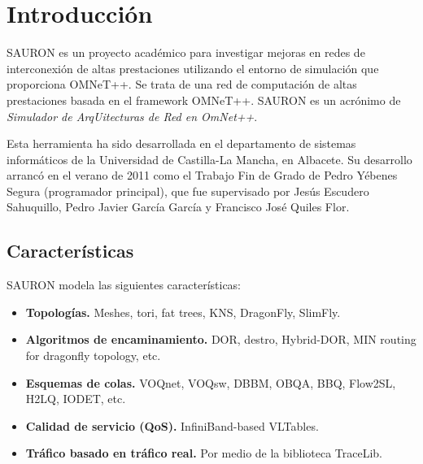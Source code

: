 \chapter{Introducción}\label{sec:cap1}
SAURON es un proyecto académico para investigar mejoras en redes de interconexión de altas prestaciones utilizando el entorno de simulación que proporciona OMNeT++. Se trata de una red de computación de altas prestaciones basada en el framework OMNeT++. SAURON es un acrónimo de \emph{Simulador de ArqUitecturas de Red en OmNet++}.

Esta herramienta ha sido desarrollada en el departamento de sistemas informáticos de la Universidad de Castilla-La Mancha, en Albacete. Su desarrollo arrancó en el verano de 2011 como el Trabajo Fin de Grado de Pedro Yébenes Segura (programador principal), que fue supervisado por Jesús Escudero Sahuquillo, Pedro Javier García García y Francisco José Quiles Flor.

\section{Características}
SAURON modela las siguientes características:

\begin{itemize}
    \item \textbf{Topologías.} Meshes, tori, fat trees, KNS, DragonFly, SlimFly.
    \item \textbf{Algoritmos de encaminamiento.} DOR, destro, Hybrid-DOR, MIN routing for dragonfly topology, etc.
    \item \textbf{Esquemas de colas.} VOQnet, VOQsw, DBBM, OBQA, BBQ, Flow2SL, H2LQ, IODET, etc.
    \item \textbf{Calidad de servicio (QoS).} InfiniBand-based VLTables.
    \item \textbf{Tráfico basado en tráfico real.} Por medio de la biblioteca TraceLib.
\end{itemize}
